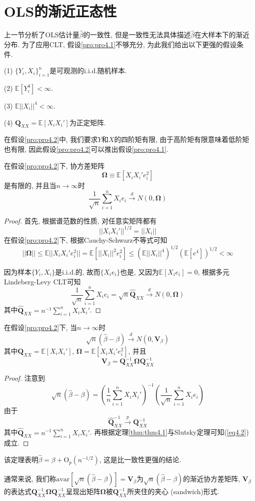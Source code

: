 \documentclass[cn, 12pt, math=mtpro2, bibstyle=apa, blue, twocol]{elegantbook}
\newcommand{\E}{\mathbb{E}}
\newcommand{\Q}{\mathbold{Q}}
\newcommand{\hb}{\hat{\beta}}
\newcommand{\V}{\mathbold{V}}
\begin{document}
\section{OLS的渐近正态性}
上一节分析了OLS估计量$\hb$的一致性, 但是一致性无法具体描述$\hb$在大样本下的渐近分布. 为了应用CLT, 假设\ref{pro:pro4.1}不够充分, 为此我们给出以下更强的假设条件.
\begin{proposition}\label{pro:pro4.2}
(1) $\{Y_i,X_i\}_{i=1}^n$是可观测的i.i.d.随机样本.

(2) $\E[Y_i^4]<\infty$.

(3) $\E||X_i||^4<\infty$.

(4) $\Q_{XX}=\E[X_iX_i']$为正定矩阵.
\end{proposition}
在假设\ref{pro:pro4.2}中, 我们要求$Y$和$X$的四阶矩有限, 由于高阶矩有限意味着低阶矩也有限, 因此假设\ref{pro:pro4.2}可以推出假设\ref{pro:pro4.1}.
\begin{theorem}\label{thm:thm4.1}
  在假设\ref{pro:pro4.2}下, 协方差矩阵
  $$\mathbold{\Omega}\equiv\E[X_iX_i'e_i^2]$$
  是有限的, 并且当$n\to\infty$时
  $$\frac{1}{\sqrt{n}}\sum_{i=1}^{n}X_ie_i\xrightarrow{d}N(0,\mathbold{\Omega})$$
\end{theorem}
\begin{proof}
  首先, 根据谱范数的性质, 对任意实矩阵都有
  $$||X_iX_i'||^{1/2}=||X_i||$$
  在假设\ref{pro:pro4.2}下, 根据Cauchy-Schwarz不等式可知
  $$||\mathbold{\Omega}||\leq\E||X_iX_i'e_i^2||=\E[||X_i||^2e_i^2]\leq(\E||X_i||^4)^{1/2}(\E[e^4])^{1/2}<\infty$$

  因为样本$\{Y_i,X_i\}$是i.i.d.的, 故而$\{X_ie_i\}$也是, 又因为$\E[X_ie_i]=0$, 根据多元Lindeberg-Levy CLT可知
  $$\frac{1}{\sqrt{n}}\sum_{i=1}^{n}X_ie_i=\sqrt{n}\hat{\Q}_{XX}\xrightarrow{d}N(0,\mathbold{\Omega})$$
  其中$\hat{\Q}_{XX}=n^{-1}\sum_{i=1}^{n}X_iX_i'$.
\end{proof}
\begin{theorem}\label{thm:thm4.2}
  在假设\ref{pro:pro4.2}下, 当$n\to\infty$时
  \begin{equation}\label{eq4.2}
    \sqrt{n}(\hb-\beta)\xrightarrow{d}N(0,\mathbold{V}_\beta)
  \end{equation}
  其中$\Q_{XX}=\E[X_iX_i']$, $\mathbold{\Omega}=\E[X_iX_i'e_i^2]$, 并且
  $$\V_\beta=\Q_{XX}^{-1}\mathbold{\Omega}\Q_{XX}^{-1}$$
\end{theorem}
\begin{proof}
  注意到
  $$\sqrt{n}(\hb-\beta)=\left(\frac{1}{n}\sum_{i=1}^{n}X_iX_i'\right)^{-1}\left(\frac{1}{\sqrt{n}}\sum_{i=1}^{n}X_ie_i\right)$$
  由于
  $$\hat{\Q}_{XX}^{-1}\xrightarrow{p}\Q_{XX}^{-1}$$
  其中$\hat{\Q}_{XX}=n^{-1}\sum_{i=1}^{n}X_iX_i'$. 再根据定理\ref{thm:thm4.1}与Slutsky定理可知(\ref{eq4.2})成立.
\end{proof}
\begin{remark}
该定理表明$\hat{\beta}=\beta+\text{O}_p(n^{-1/2})$, 这是比一致性更强的结论.
\end{remark}
通常来说, 我们称$\text{avar}[\sqrt{n}(\hb-\beta)]=\V_\beta$为$\sqrt{n}(\hb-\beta)$的渐近协方差矩阵, $\V_\beta$的表达式$\Q_{XX}^{-1}\mathbold{\Omega}\Q_{XX}^{-1}$呈现出矩阵$\mathbold{\Omega}$被$\Q_{XX}^{-1}$所夹住的夹心 (sandwich)形式.
\end{document}
